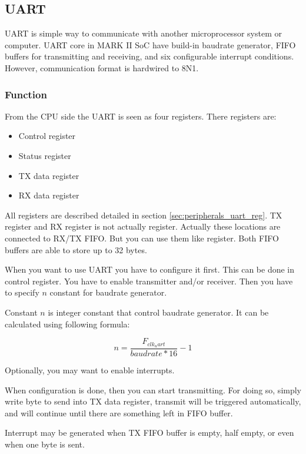 \subsection{UART}

UART is simple way to communicate with another microprocessor system or
computer. UART core in MARK II SoC have build-in baudrate generator, FIFO
buffers for transmitting and receiving, and six configurable interrupt
conditions. However, communication format is hardwired to 8N1.

\subsubsection{Function}

From the CPU side the UART is seen as four registers. There registers are:

\begin{itemize}
    \item Control register
    \item Status register
    \item TX data register
    \item RX data register
\end{itemize}

All registers are described detailed in section \ref{sec:peripherals_uart_reg}.
TX register and RX register is not actually register. Actually these locations
are connected to RX/TX FIFO. But you can use them like register. Both FIFO buffers
are able to store up to 32 bytes.

When you want to use UART you have to configure it first. This can be done in
control register. You have to enable transmitter and/or receiver. Then you have
to specify $n$ constant for baudrate generator.

Constant $n$ is integer constant that control baudrate generator. It can be
calculated using following formula:

$$
    n = \frac{F_{clk_uart}}{baudrate*16} - 1
$$

Optionally, you may want to enable interrupts.

When configuration is done, then you can start transmitting. For doing so,
simply write byte to send into TX data register, transmit will be triggered
automatically, and will continue until there are something left in FIFO buffer.

Interrupt may be generated when TX FIFO buffer is empty, half empty, or even when
one byte is sent.

